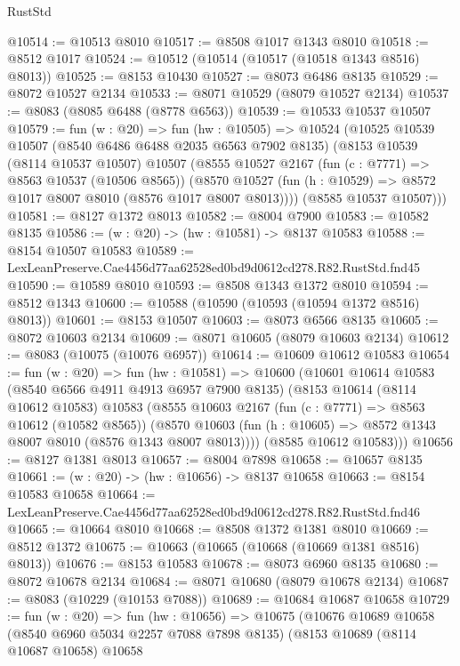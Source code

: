 \begin{lexlean}{RustStd}
\begin{coremodule}
@10514 := @10513 @8010
@10517 := @8508 @1017 @1343 @8010
@10518 := @8512 @1017
@10524 := @10512 (@10514 (@10517 (@10518 @1343 @8516) @8013))
@10525 := @8153 @10430
@10527 := @8073 @6486 @8135
@10529 := @8072 @10527 @2134
@10533 := @8071 @10529 (@8079 @10527 @2134)
@10537 := @8083 (@8085 @6488 (@8778 @6563))
@10539 := @10533 @10537 @10507
@10579 := fun (w : @20) =>
  fun (hw : @10505) =>
  @10524
    (@10525
      @10539
      @10507
      (@8540 @6486 @6488 @2035 @6563 @7902 @8135)
      (@8153
        @10539
        (@8114 @10537 @10507)
        @10507
        (@8555
          @10527
          @2167
          (fun (c : @7771) => @8563 @10537 (@10506 @8565))
          (@8570 @10527 (fun (h : @10529) => @8572 @1017 @8007 @8010 (@8576 @1017 @8007 @8013))))
        (@8585 @10537 @10507)))
@10581 := @8127 @1372 @8013
@10582 := @8004 @7900
@10583 := @10582 @8135
@10586 := (w : @20) -> (hw : @10581) -> @8137 @10583
@10588 := @8154 @10507 @10583
@10589 := LexLeanPreserve.Cae4456d77aa62528ed0bd9d0612cd278.R82.RustStd.fnd45
@10590 := @10589 @8010
@10593 := @8508 @1343 @1372 @8010
@10594 := @8512 @1343
@10600 := @10588 (@10590 (@10593 (@10594 @1372 @8516) @8013))
@10601 := @8153 @10507
@10603 := @8073 @6566 @8135
@10605 := @8072 @10603 @2134
@10609 := @8071 @10605 (@8079 @10603 @2134)
@10612 := @8083 (@10075 (@10076 @6957))
@10614 := @10609 @10612 @10583
@10654 := fun (w : @20) =>
  fun (hw : @10581) =>
  @10600
    (@10601
      @10614
      @10583
      (@8540 @6566 @4911 @4913 @6957 @7900 @8135)
      (@8153
        @10614
        (@8114 @10612 @10583)
        @10583
        (@8555
          @10603
          @2167
          (fun (c : @7771) => @8563 @10612 (@10582 @8565))
          (@8570 @10603 (fun (h : @10605) => @8572 @1343 @8007 @8010 (@8576 @1343 @8007 @8013))))
        (@8585 @10612 @10583)))
@10656 := @8127 @1381 @8013
@10657 := @8004 @7898
@10658 := @10657 @8135
@10661 := (w : @20) -> (hw : @10656) -> @8137 @10658
@10663 := @8154 @10583 @10658
@10664 := LexLeanPreserve.Cae4456d77aa62528ed0bd9d0612cd278.R82.RustStd.fnd46
@10665 := @10664 @8010
@10668 := @8508 @1372 @1381 @8010
@10669 := @8512 @1372
@10675 := @10663 (@10665 (@10668 (@10669 @1381 @8516) @8013))
@10676 := @8153 @10583
@10678 := @8073 @6960 @8135
@10680 := @8072 @10678 @2134
@10684 := @8071 @10680 (@8079 @10678 @2134)
@10687 := @8083 (@10229 (@10153 @7088))
@10689 := @10684 @10687 @10658
@10729 := fun (w : @20) =>
  fun (hw : @10656) =>
  @10675
    (@10676
      @10689
      @10658
      (@8540 @6960 @5034 @2257 @7088 @7898 @8135)
      (@8153
        @10689
        (@8114 @10687 @10658)
        @10658

\end{coremodule}
\end{lexlean}
